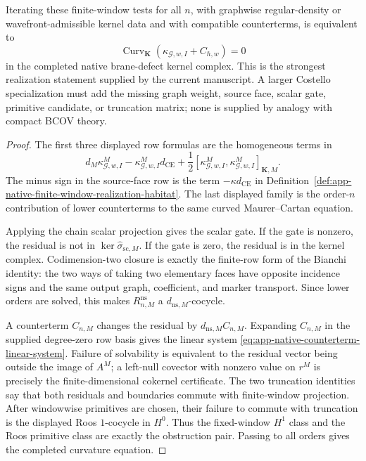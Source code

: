 \begin{thm}
  Iterating these finite-window tests for all \(n\), with graphwise
  regular-density or wavefront-admissible kernel data and with compatible
  counterterms, is equivalent to
  \[
    \operatorname{Curv}_{\mathbf K}
      (\kappa_{\mathcal G,w,I}+C_{\hbar,w})=0
  \]
  in the completed native brane-defect kernel complex.  This is the
  strongest realization statement supplied by the current manuscript.  A
  larger Costello specialization must add the missing graph weight, source
  face, scalar gate, primitive candidate, or truncation matrix; none is
  supplied by analogy with compact BCOV theory.
\end{thm}

\begin{proof}
  The first three displayed row formulas are the homogeneous terms in
  \[
    d_M\kappa^M_{\mathcal G,w,I}
      -\kappa^M_{\mathcal G,w,I}d_{\mathrm{CE}}
      +\frac12[\kappa^M_{\mathcal G,w,I},
               \kappa^M_{\mathcal G,w,I}]_{\mathbf K,M}.
  \]
  The minus sign in the source-face row is the term
  \(-\kappa d_{\mathrm{CE}}\) in
  Definition~\ref{def:app-native-finite-window-realization-habitat}.  The
  last displayed family is the order-\(n\) contribution of lower
  counterterms to the same curved Maurer--Cartan equation.

  Applying the chain scalar projection gives the scalar gate.  If the
  gate is nonzero, the residual is not in
  \(\ker\widehat\sigma_{\mathrm{sc},M}\).  If the gate is zero, the
  residual is in the kernel complex.  Codimension-two closure is exactly
  the finite-row form of the Bianchi identity: the two ways of taking two
  elementary faces have opposite incidence signs and the same output graph,
  coefficient, and marker transport.  Since lower orders are solved, this
  makes \(R^{\mathrm{ns}}_{n,M}\) a \(d_{\mathrm{ns},M}\)-cocycle.

  A counterterm \(C_{n,M}\) changes the residual by
  \(d_{\mathrm{ns},M}C_{n,M}\).  Expanding \(C_{n,M}\) in the supplied
  degree-zero row basis gives the linear system
  \eqref{eq:app-native-counterterm-linear-system}.  Failure of solvability
  is equivalent to the residual vector being outside the image of \(A^M\);
  a left-null covector with nonzero value on \(r^M\) is precisely the
  finite-dimensional cokernel certificate.  The two truncation identities
  say that both residuals and boundaries commute with finite-window
  projection.  After windowwise primitives are chosen, their failure to
  commute with truncation is the displayed Roos \(1\)-cocycle in
  \(H^0\).  Thus the fixed-window \(H^1\) class and the Roos primitive
  class are exactly the obstruction pair.  Passing to all orders gives the
  completed curvature equation.
\end{proof}

